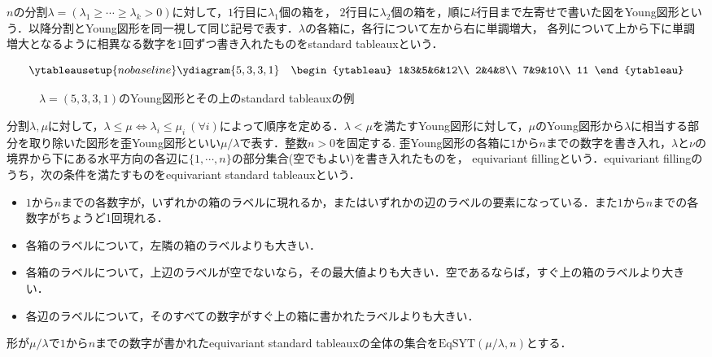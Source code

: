 \begin{defin}
  $n$の分割$\lambda=(\lambda_1\geq\cdots\geq\lambda_k>0)$に対して，$1$行目に$\lambda_1$個の箱を， $2$行目に$\lambda_2$個の箱を，順に$k$行目まで左寄せで書いた図をYoung図形という．以降分割とYoung図形を同一視して同じ記号で表す．$\lambda$の各箱に，各行について左から右に単調増大， 各列について上から下に単調増大となるように相異なる数字を$1$回ずつ書き入れたものをstandard tableauxという．
\end{defin}

\begin{eg}
\[
\ytableausetup{nobaseline}
\ydiagram{5, 3, 3, 1}
\quad\begin{ytableau}
    1&3&5&6&12\\
    2&4&8\\
    7&9&10\\
    11
\end{ytableau}
\]
\begin{figure}[htbp]
  \centering
  \caption{$\lambda=(5,3,3,1)$のYoung図形とその上のstandard tableauxの例}
\end{figure}
\end{eg}


\begin{defin}\label{label condition}
  分割$\lambda, \mu$に対して，$\lambda\leq\mu\Leftrightarrow \lambda_i\leq\mu_i\:(\forall i)$によって順序を定める．$\lambda<\mu$を満たすYoung図形に対して，$\mu$のYoung図形から$\lambda$に相当する部分を取り除いた図形を歪Young図形といい$\mu/\lambda$で表す．整数$n>0$を固定する. 歪Young図形の各箱に$1$から$n$までの数字を書き入れ，$\lambda$と$\nu$の境界から下にある水平方向の各辺に$\{1,\cdots,n\}$の部分集合(空でもよい)を書き入れたものを， equivariant fillingという．equivariant fillingのうち，次の条件を満たすものをequivariant standard tableauxという．
  \begin{itemize}
    \item $1$から$n$までの各数字が，いずれかの箱のラベルに現れるか，またはいずれかの辺のラベルの要素になっている．また$1$から$n$までの各数字がちょうど1回現れる．
    \item 各箱のラベルについて，左隣の箱のラベルよりも大きい．
    \item 各箱のラベルについて，上辺のラベルが空でないなら，その最大値よりも大きい．空であるならば，すぐ上の箱のラベルより大きい．
    \item 各辺のラベルについて，そのすべての数字がすぐ上の箱に書かれたラベルよりも大きい．
  \end{itemize}
  形が$\mu/\lambda$で$1$から$n$までの数字が書かれたequivariant standard tableauxの全体の集合を$\text{EqSYT}(\mu/\lambda, n)$とする．
\end{defin}

